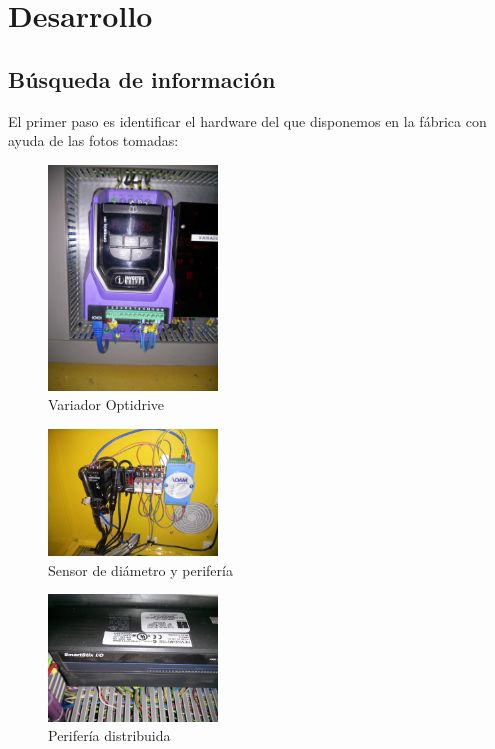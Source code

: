 \chapter{Desarrollo}
\label{hardware}

\section{Búsqueda de información}
\label{busqueda_informacion}

El primer paso es identificar el hardware del que disponemos en la fábrica con ayuda de las fotos tomadas:
    \begin{figure}[H]
            \centering
            \includegraphics[width=0.4\textwidth]{images/huesca/IMG_20141216_174810.jpg}
            \caption{Variador Optidrive}
            \label{fig:hardware_variador}
    \end{figure}

    \begin{figure}[H]
            \centering
            \includegraphics[width=0.4\textwidth]{images/huesca/IMG_20141216_174824.jpg}
            \caption{Sensor de diámetro y perifería}
            \label{fig:hardware_diametro}
    \end{figure}

    \begin{figure}[H]
            \centering
            \includegraphics[width=0.4\textwidth]{images/huesca/IMG_20141216_174925.jpg}
            \caption{Perifería distribuida}
            \label{fig:hardware_periferia}
    \end{figure}

